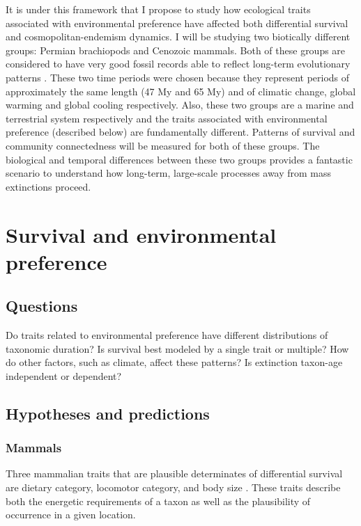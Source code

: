 \documentclass[12pt,letterpaper]{article}
\begin{document}
It is under this framework that I propose to study how ecological traits associated with environmental preference have affected both differential survival and cosmopolitan-endemism dynamics. I will be studying two biotically different groups: Permian brachiopods and Cenozoic mammals. Both of these groups are considered to have very good fossil records able to reflect long-term evolutionary patterns \citep{Mark1977}. These two time periods were chosen because they represent periods of approximately the same length (47 My and 65 My) and of climatic change, global warming and global cooling respectively. Also, these two groups are a marine and terrestrial system respectively and the traits associated with environmental preference (described below) are fundamentally different. Patterns of survival and community connectedness will be measured for both of these groups. The biological and temporal differences between these two groups provides a fantastic scenario to understand how long-term, large-scale processes away from mass extinctions proceed.


\section{Survival and environmental preference}
\subsection{Questions}
Do traits related to environmental preference have different distributions of taxonomic duration? Is survival best modeled by a single trait or multiple? How do other factors, such as climate, affect these patterns? Is extinction taxon-age independent or dependent?

\subsection{Hypotheses and predictions}
\subsubsection{Mammals}
Three mammalian traits that are plausible determinates of differential survival are dietary category, locomotor category, and body size \citep{Price2012,Smith2004,Jernvall2004,Janis1993a,Blois2009,Liow2008,Alroy2000g,Johnson2002b}. These traits describe both the energetic requirements of a taxon as well as the plausibility of occurrence in a given location.
\end{document}

